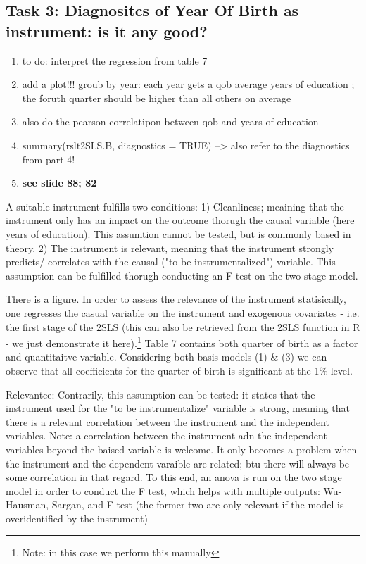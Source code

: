 \documentclass[a4paper]{article}
\begin{document}
\subsection{Task 3: Diagnositcs of Year Of Birth as instrument: is it any good?}

\begin{enumerate}
   \item to do: interpret the regression from table 7
   \item add a plot!!! groub by year: each year gets a qob average years of education ; the foruth quarter should be higher than all others on average
   \item also do the pearson correlatipon between qob and years of education
   \item summary(rslt2SLS.B, diagnostics = TRUE) --> also refer to the diagnostics from part 4!
   \item \textbf{see slide 88; 82}
\end{enumerate}


A suitable instrument fulfills two conditions: 1) Cleanliness; meaining that the instrument only has an impact on the outcome thorugh the causal variable (here years of education). This assumtion cannot be tested, but is commonly based in theory.
2) The instrument is relevant, meaning that the instrument strongly predicts/ correlates with the causal ("to be instrumentalized") variable. This assumption can be fulfilled thorugh conducting an F test on the two stage model. 



There is a figure. In order to assess the relevance of the instrument statisically, one regresses the casual variable on the instrument and exogenous covariates - i.e. the first stage of the 2SLS (this can also be retrieved from the 2SLS function in R - we just demonstrate it here).\footnote{Note: in this case we perform this manually} Table 7 contains both quarter of birth as a factor and quantitaitve variable. Considering both basis models (1) \& (3) we can observe that all coefficients for the quarter of birth is significant at the 1\% level. 






Relevantce: Contrarily, this assumption can be tested: it states that the instrument used for the "to be instrumentalize" variable is strong, meaning that there is a relevant correlation between the instrument and the independent variables. Note: a correlation between the instrument adn the independent variables beyond the baised variable is welcome. It only becomes a problem when the instrument and the dependent varaible are related; btu there will always be some correlation in that regard. To this end, an anova is run on the two stage model in order to conduct the F test, which helps with multiple outputs: Wu-Hausman, Sargan, and F test (the former two are only relevant if the model is overidentified by the instrument)
\end{document}

